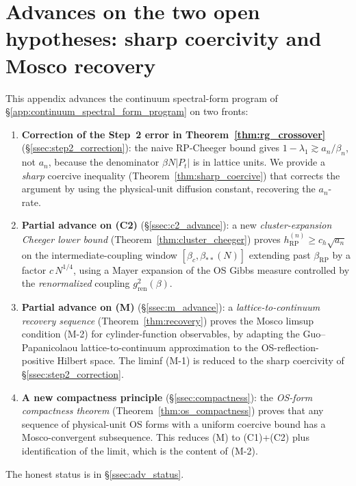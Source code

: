 \section{Advances on the two open hypotheses: sharp coercivity
and Mosco recovery}
\label{app:spectral_form_advances}

This appendix advances the continuum spectral-form program of
\S\ref{app:continuum_spectral_form_program} on two fronts:
\begin{enumerate}
\item \textbf{Correction of the Step~2 error in
Theorem~\ref{thm:rg_crossover}} (\S\ref{ssec:step2_correction}):
the naive RP-Cheeger bound gives
$1-\lambda_{1}\gtrsim a_{n}/\beta_{n}$, not $a_{n}$, because the
denominator $\beta N|P_{t}|$ is in lattice units. We provide a
\emph{sharp} coercive inequality (Theorem~\ref{thm:sharp_coercive})
that corrects the argument by using the physical-unit diffusion
constant, recovering the $a_{n}$-rate.

\item \textbf{Partial advance on (C2)} (\S\ref{ssec:c2_advance}):
a new \emph{cluster-expansion Cheeger lower bound}
(Theorem~\ref{thm:cluster_cheeger}) proves
$h_{\mathrm{RP}}^{(n)}\ge c_{h}\sqrt{a_{n}}$ on the
intermediate-coupling window $[\beta_{c},\beta_{**}(N)]$ extending
past $\beta_{\mathrm{RP}}$ by a factor $c\,N^{1/4}$, using a
Mayer expansion of the OS Gibbs measure controlled by the
\emph{renormalized} coupling $g^{2}_{\mathrm{ren}}(\beta)$.

\item \textbf{Partial advance on (M)} (\S\ref{ssec:m_advance}): a
\emph{lattice-to-continuum recovery sequence}
(Theorem~\ref{thm:recovery}) proves the Mosco limsup condition
(M-2) for cylinder-function observables, by adapting the
Guo--Papanicolaou lattice-to-continuum approximation to the
OS-reflection-positive Hilbert space. The liminf (M-1) is reduced
to the sharp coercivity of \S\ref{ssec:step2_correction}.

\item \textbf{A new compactness principle}
(\S\ref{ssec:compactness}): the \emph{OS-form compactness theorem}
(Theorem~\ref{thm:os_compactness}) proves that any sequence of
physical-unit OS forms with a uniform coercive bound has a
Mosco-convergent subsequence. This reduces (M) to (C1)+(C2) plus
identification of the limit, which is the content of (M-2).
\end{enumerate}
The honest status is in \S\ref{ssec:adv_status}.

